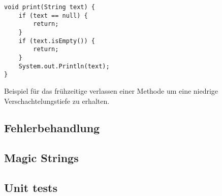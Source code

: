 \begin{listing}[H]
    \begin{verbatim}
void print(String text) {
    if (text == null) {
        return;
    }
    if (text.isEmpty()) {
        return;
    }
    System.out.Println(text);
}
    \end{verbatim}
    \caption{Beispiel für das frühzeitige verlassen einer Methode um eine niedrige Verschachtelungstiefe zu erhalten.}
    \label{own:lowindent}
\end{listing}

\subsection{Fehlerbehandlung}
\subsection{Magic Strings}
\subsection{Unit tests}

